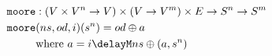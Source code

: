 \documentclass[preview]{standalone}
\begin{document}
\begin{align*}
  \texttt{moore} &: (V \times V^n \rightarrow V) \times (V \rightarrow V^m) \times E
                   \rightarrow S^n \rightarrow S^m \\
  \texttt{moore} &(ns,od,i)(s^n) = od \oplus a \\
                 &\text{where}\ a = i \delayM ns \oplus (a, s^n)
\end{align*}
\end{document}

